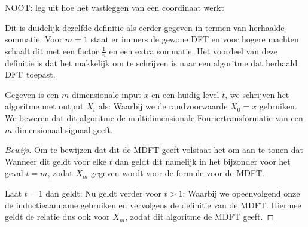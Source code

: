 NOOT: leg uit hoe het vastleggen van een coordinaat werkt

Dit is duidelijk dezelfde definitie als eerder gegeven in termen van herhaalde sommatie. Voor $m=1$ staat er immers de gewone DFT en voor hogere machten schaalt dit met een factor $\tfrac{1}{n}$ en een extra sommatie.
Het voordeel van deze definitie is dat het makkelijk om te schrijven is naar een algoritme dat 
herhaald $\text{DFT}$ toepast.
\begin{algo}
Gegeven is een $m$-dimensionale input $x$ en een huidig level $t$, 
we schrijven het algoritme met output $X_t$ als:
Waarbij we de randvoorwaarde $X_0 = x$ gebruiken. We beweren dat dit algoritme de multidimensionale Fouriertransformatie van een $m$-dimensionaal signaal geeft.
\end{algo}
\begin{proof}[Bewijs]
Om te bewijzen dat dit de MDFT geeft volstaat het om aan te tonen dat
Wanneer dit geldt voor elke $t$ dan geldt dit namelijk in het bijzonder voor het geval $t=m$, 
zodat $X_m$ gegeven wordt voor de formule voor de MDFT.

Laat $t=1$ dan geldt:
Nu geldt verder voor $t>1$:
Waarbij we opeenvolgend onze de inductieaanname gebruiken en vervolgens de definitie van de MDFT.
Hiermee geldt de relatie dus ook voor $X_m$, zodat dit algoritme de MDFT geeft.
\end{proof}

